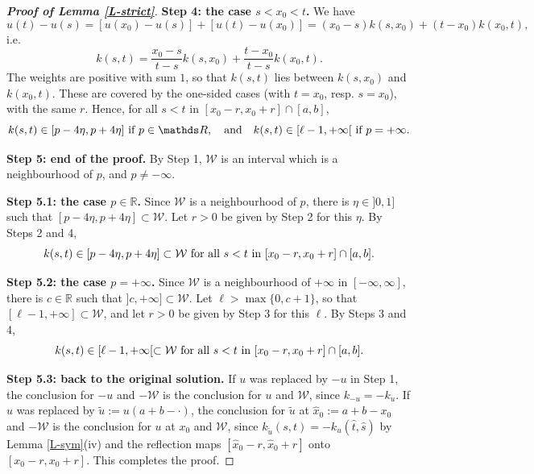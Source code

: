 \documentclass[reqno,12pt]{amsart}
\numberwithin{equation}{section}
\def\RR{{\mathds R}}
\theoremstyle{remark}
\begin{document}
\begin{proof}[\bf Proof of Lemma \ref{L-strict}]
{\bf Step 4: the case \boldmath$s<x_0<t$\unboldmath.} We have
\begin{equation*}
u(t)-u(s)=[u(x_0)-u(s)]+[u(t)-u(x_0)]=(x_0-s)k(s,x_0)+(t-x_0)k(x_0,t),
\end{equation*}
i.e.
\begin{equation*}
k(s,t)=\frac{x_0-s}{t-s}k(s,x_0)+\frac{t-x_0}{t-s}k(x_0,t).
\end{equation*}
The weights are positive with sum $1$, so that $k(s,t)$ lies between $k(s,x_0)$ and $k(x_0,t)$. These are covered by the one-sided cases (with $t=x_0$, resp. $s=x_0$), with the same $r$. Hence, for all $s<t$ in $[x_0-r,x_0+r]\cap[a,b]$,
\begin{equation*}
k(s,t)\in[p-4\eta,p+4\eta]\hbox{ if }p\in\RR,\quad\hbox{and}\quad k(s,t)\in[\ell-1,+\infty[\hbox{ if }p=+\infty.
\end{equation*}

\bigskip

{\bf Step 5: end of the proof.} By Step 1, $\mathcal{W}$ is an interval which is a neighbourhood of $p$, and $p\neq-\infty$.

\medskip

{\bf Step 5.1: the case \boldmath$p\in\RR$\unboldmath.} Since $\mathcal{W}$ is a neighbourhood of $p$, there is $\eta\in]0,1]$ such that $[p-4\eta,p+4\eta]\subset\mathcal{W}$. Let $r>0$ be given by Step 2 for this $\eta$. By Steps 2 and 4,
\begin{equation*}
k(s,t)\in[p-4\eta,p+4\eta]\subset\mathcal{W}\hbox{ for all }s<t\hbox{ in }[x_0-r,x_0+r]\cap[a,b].
\end{equation*}

\medskip

{\bf Step 5.2: the case \boldmath$p=+\infty$\unboldmath.} Since $\mathcal{W}$ is a neighbourhood of $+\infty$ in $[-\infty,\infty]$, there is $c\in\RR$ such that $]c,+\infty]\subset\mathcal{W}$. Let $\ell>\max\{0,c+1\}$, so that $[\ell-1,+\infty]\subset\mathcal{W}$, and let $r>0$ be given by Step 3 for this $\ell$. By Steps 3 and 4,
\begin{equation*}
k(s,t)\in[\ell-1,+\infty[\subset\mathcal{W}\hbox{ for all }s<t\hbox{ in }[x_0-r,x_0+r]\cap[a,b].
\end{equation*}

\medskip

{\bf Step 5.3: back to the original solution.} If $u$ was replaced by $-u$ in Step 1, the conclusion for $-u$ and $-\mathcal{W}$ is the conclusion for $u$ and $\mathcal{W}$, since $k_{-u}=-k_u$. If $u$ was replaced by $\widetilde u:=u(a+b-\cdot)$, the conclusion for $\widetilde u$ at $\widehat x_0:=a+b-x_0$ and $-\mathcal{W}$ is the conclusion for $u$ at $x_0$ and $\mathcal{W}$, since $k_{\widetilde u}(s,t)=-k_u(\widehat t,\widehat s)$ by Lemma \ref{L-sym}(iv) and the reflection maps $[\widehat x_0-r,\widehat x_0+r]$ onto $[x_0-r,x_0+r]$. This completes the proof.
\end{proof}
\end{document}
